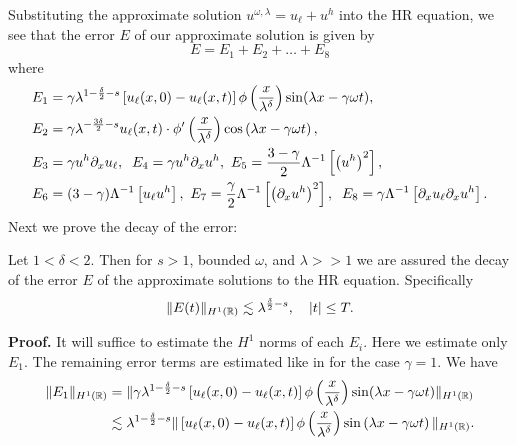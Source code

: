 Substituting the
approximate solution $u^{\omega, \lambda} = u_\ell + u^h$ into the HR
equation, we see that the error
$E$ of our approximate solution is given by
%
%
\begin{equation*}
E=E_1 + E_2 + \dots + E_8
\end{equation*}
%
%
where
%
%
\begin{equation}
\label{all_errors_together}
\begin{split}
E_1 & = \gamma \lambda^{1 -\frac{\delta}{2}-s}  \left[ u_\ell(x,0) - u_\ell(x,t)
\right] \phi\left(
\frac{x}{\lambda^ \delta}
\right)\sin(\lambda x - \gamma \omega t),
\\
E_2 & = \gamma \lambda^{-\frac{3\delta}{2}-s}
u_\ell(x,t) \cdot \phi'\left( \frac{x}{\lambda^\delta} \right)\cos\left( \lambda
x - \gamma \omega t
\right),
\\
E_3 & = \gamma u^h \p_x u_\ell, \; \; E_4 = \gamma u^h \p_x u^h, \ E_5  = 
 \frac{3-\gamma}{2} \Lambda^{-1} \left[  \left( u^h \right)^2 \right], \\
E_6 & = (3- \gamma)\Lambda^{-1}
  \left[ u_\ell u^h \right], \  E_7 = \frac{\gamma}{2} \Lambda^{-1} \left[ 
 \left(
\p_x u^h \right)^2 \right ], \; \;
E_8 = \gamma \Lambda^{-1} \left[  \p_x u_\ell \p_x u^h \right]
.
\end{split}
\end{equation}
%
%
%
Next we prove the decay of the error:
%
%
\begin{proposition}
Let $1<\delta<2$. Then for $s > 1$, bounded $\omega$, and
$\lambda >>1$ we are assured the decay of the error $E$ of the
approximate solutions to the HR equation. Specifically
%
%
%
\begin{equation}
\label{E-est}
\|E(t)\|_{H^1(\mathbb{R})} \lesssim \lambda^{\frac{\delta}{2} -s}, \quad |t| \le 
T.
\end{equation}
%
%
%
\end{proposition}
%
%
%
\textbf{Proof.}
It will suffice to estimate the $H^1$ norms of each $E_i$.
Here we estimate only $E_1$. 
The remaining error terms are estimated 
like in \cite{Himonas:2009fk} for the case $\gamma=1$.
We have
%
%
\begin{equation}
	\label{fw-est}
\begin{split}
\|E_1\|_{H^1(\mathbb{R})}
& = \| \gamma \lambda^{1 -\frac{\delta}{2}-s} \left[ u_\ell(x,0) - u_\ell(x,t) \right]
 \phi\left( \frac{x}{\lambda^\delta}
\right ) \sin (\lambda x - \gamma \omega t )\|_{H^1(\mathbb{R})}
\\
& \lesssim \lambda^{1 -\frac{\delta}{2} -s } \|\left[ u_\ell(x,0) - 
u_\ell(x,t)
\right] \phi\left( \frac{x}{\lambda^\delta} \right )
\sin\left( \lambda x - \gamma \omega t
\right) \|_{H^1(\mathbb{R})}.
\end{split}
\end{equation}
